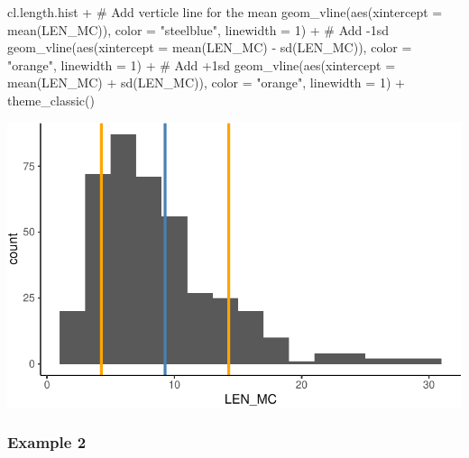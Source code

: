 \documentclass[
  11pt,
  letterpaper,
  DIV=11,
  numbers=noendperiod]{scrreprt}
\newenvironment{Shaded}{\begin{snugshade}}{\end{snugshade}}
\newcommand{\AttributeTok}[1]{\textcolor[rgb]{0.40,0.45,0.13}{#1}}
\newcommand{\CommentTok}[1]{\textcolor[rgb]{0.37,0.37,0.37}{#1}}
\newcommand{\DecValTok}[1]{\textcolor[rgb]{0.68,0.00,0.00}{#1}}
\newcommand{\FunctionTok}[1]{\textcolor[rgb]{0.28,0.35,0.67}{#1}}
\newcommand{\NormalTok}[1]{\textcolor[rgb]{0.00,0.23,0.31}{#1}}
\newcommand{\SpecialCharTok}[1]{\textcolor[rgb]{0.37,0.37,0.37}{#1}}
\newcommand{\StringTok}[1]{\textcolor[rgb]{0.13,0.47,0.30}{#1}}
\begin{document}
\begin{Shaded}
\begin{Highlighting}[]
\NormalTok{cl.length.hist }\SpecialCharTok{+}
  \CommentTok{\# Add verticle line for the mean}
  \FunctionTok{geom\_vline}\NormalTok{(}\FunctionTok{aes}\NormalTok{(}\AttributeTok{xintercept =} \FunctionTok{mean}\NormalTok{(LEN\_MC)), }\AttributeTok{color =} \StringTok{"steelblue"}\NormalTok{, }\AttributeTok{linewidth =} \DecValTok{1}\NormalTok{) }\SpecialCharTok{+}
  \CommentTok{\# Add {-}1sd}
  \FunctionTok{geom\_vline}\NormalTok{(}\FunctionTok{aes}\NormalTok{(}\AttributeTok{xintercept =} \FunctionTok{mean}\NormalTok{(LEN\_MC) }\SpecialCharTok{{-}} \FunctionTok{sd}\NormalTok{(LEN\_MC)), }\AttributeTok{color =} \StringTok{"orange"}\NormalTok{, }\AttributeTok{linewidth =} \DecValTok{1}\NormalTok{) }\SpecialCharTok{+}
  \CommentTok{\# Add +1sd}
  \FunctionTok{geom\_vline}\NormalTok{(}\FunctionTok{aes}\NormalTok{(}\AttributeTok{xintercept =} \FunctionTok{mean}\NormalTok{(LEN\_MC) }\SpecialCharTok{+} \FunctionTok{sd}\NormalTok{(LEN\_MC)), }\AttributeTok{color =} \StringTok{"orange"}\NormalTok{, }\AttributeTok{linewidth =} \DecValTok{1}\NormalTok{) }\SpecialCharTok{+}
  \FunctionTok{theme\_classic}\NormalTok{()}
\end{Highlighting}
\end{Shaded}

\includegraphics{Summary_statistics_files/figure-pdf/unnamed-chunk-18-1.pdf}

\subsubsection{Example 2}
\end{document}
